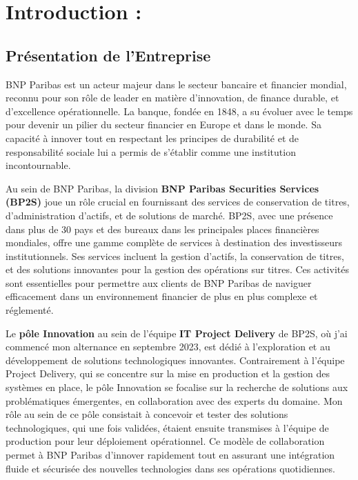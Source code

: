\documentclass[13pt,a4paper]{article}
\begin{document}
\section{ \Large \bf Introduction :  }

\subsection{Présentation de l'Entreprise} 
BNP Paribas est un acteur majeur dans le secteur bancaire et financier mondial, reconnu pour son rôle de leader en matière d'innovation, de finance durable, et d'excellence opérationnelle. La banque, fondée en 1848, a su évoluer avec le temps pour devenir un pilier du secteur financier en Europe et dans le monde. Sa capacité à innover tout en respectant les principes de durabilité et de responsabilité sociale lui a permis de s'établir comme une institution incontournable.

Au sein de BNP Paribas, la division \textbf{BNP Paribas Securities Services (BP2S)} joue un rôle crucial en fournissant des services de conservation de titres, d'administration d'actifs, et de solutions de marché. BP2S, avec une présence dans plus de 30 pays et des bureaux dans les principales places financières mondiales, offre une gamme complète de services à destination des investisseurs institutionnels. Ses services incluent la gestion d'actifs, la conservation de titres, et des solutions innovantes pour la gestion des opérations sur titres. Ces activités sont essentielles pour permettre aux clients de BNP Paribas de naviguer efficacement dans un environnement financier de plus en plus complexe et réglementé.

Le \textbf{pôle Innovation} au sein de l'équipe \textbf{IT Project Delivery} de BP2S, où j'ai commencé mon alternance en septembre 2023, est dédié à l'exploration et au développement de solutions technologiques innovantes. Contrairement à l'équipe Project Delivery, qui se concentre sur la mise en production et la gestion des systèmes en place, le pôle Innovation se focalise sur la recherche de solutions aux problématiques émergentes, en collaboration avec des experts du domaine. Mon rôle au sein de ce pôle consistait à concevoir et tester des solutions technologiques, qui une fois validées, étaient ensuite transmises à l'équipe de production pour leur déploiement opérationnel. Ce modèle de collaboration permet à BNP Paribas d'innover rapidement tout en assurant une intégration fluide et sécurisée des nouvelles technologies dans ses opérations quotidiennes.
\end{document}
